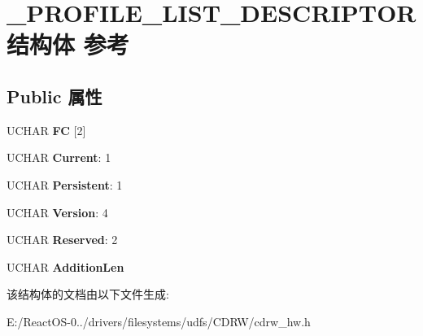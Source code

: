 \hypertarget{struct___p_r_o_f_i_l_e___l_i_s_t___d_e_s_c_r_i_p_t_o_r}{}\section{\+\_\+\+P\+R\+O\+F\+I\+L\+E\+\_\+\+L\+I\+S\+T\+\_\+\+D\+E\+S\+C\+R\+I\+P\+T\+O\+R结构体 参考}
\label{struct___p_r_o_f_i_l_e___l_i_s_t___d_e_s_c_r_i_p_t_o_r}
\subsection*{Public 属性}
\begin{DoxyCompactItemize}
\item 
\mbox{\label{struct___p_r_o_f_i_l_e___l_i_s_t___d_e_s_c_r_i_p_t_o_r_af30c1dea93ed7e64426c767dcaf9021b}} 
U\+C\+H\+AR {\bfseries FC} \mbox{[}2\mbox{]}
\item 
\mbox{\label{struct___p_r_o_f_i_l_e___l_i_s_t___d_e_s_c_r_i_p_t_o_r_aebb2561e1e2949b5efed80318b2931b0}} 
U\+C\+H\+AR {\bfseries Current}\+: 1
\item 
\mbox{\label{struct___p_r_o_f_i_l_e___l_i_s_t___d_e_s_c_r_i_p_t_o_r_a896bc35db4a6d426bf4695707eb47e83}} 
U\+C\+H\+AR {\bfseries Persistent}\+: 1
\item 
\mbox{\label{struct___p_r_o_f_i_l_e___l_i_s_t___d_e_s_c_r_i_p_t_o_r_a06bae404f1bb0b3bbe6bd8f995d8c63c}} 
U\+C\+H\+AR {\bfseries Version}\+: 4
\item 
\mbox{\label{struct___p_r_o_f_i_l_e___l_i_s_t___d_e_s_c_r_i_p_t_o_r_a3575aecbe089bf59f6bd4abd17b8acc3}} 
U\+C\+H\+AR {\bfseries Reserved}\+: 2
\item 
\mbox{\label{struct___p_r_o_f_i_l_e___l_i_s_t___d_e_s_c_r_i_p_t_o_r_a0c11d86f35026fa49931699b294e9ffa}} 
U\+C\+H\+AR {\bfseries Addition\+Len}
\end{DoxyCompactItemize}


该结构体的文档由以下文件生成\+:\begin{DoxyCompactItemize}
\item 
E\+:/\+React\+O\+S-\/0../drivers/filesystems/udfs/\+C\+D\+R\+W/cdrw\+\_\+hw.\+h\end{DoxyCompactItemize}
